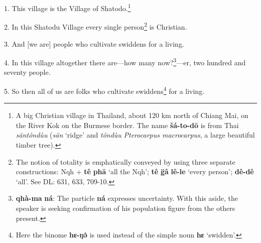 \setcounter{footnote}{0}

1. This village is the Village of Shatodo.\footnote{A big Christian village in Thailand, about 120 km north of Chiang Mai, on the River Kok on the Burmese border. The name \textbf{šá-to-dō} is from Thai \textit{săntôndùu} (\textit{săn} `ridge' and \textit{tôndùu} \textit{Pterocarpus macrocarpus}, a large beautiful timber tree).}

2. In this Shatodu Village every single person\footnote{The notion of totality is emphatically conveyed by using three separate constructions: Nqh + \textbf{tê} \textbf{phā} `all the Nqh'; \textbf{tê} \textbf{g̈â} \textbf{lê-le} `every person'; \textbf{dê-dê} `all'. See DL: 631, 633, 709-10.} is Christian.

3. And [we are] people who cultivate swiddens for a living.

4. In this village altogether there are---how many now?\footnote{\textbf{qhà-ma} \textbf{ná}: The particle \textbf{ná} expresses uncertainty. With this aside, the speaker is seeking confirmation of his population figure from the others present.}---er, two hundred and
seventy people.

5. So then all of us are folks who cultivate swiddens\footnote{Here the binome \textbf{hɛ-ŋə̂} is used instead of the simple noun \textbf{hɛ} `swidden'.} for a living.

